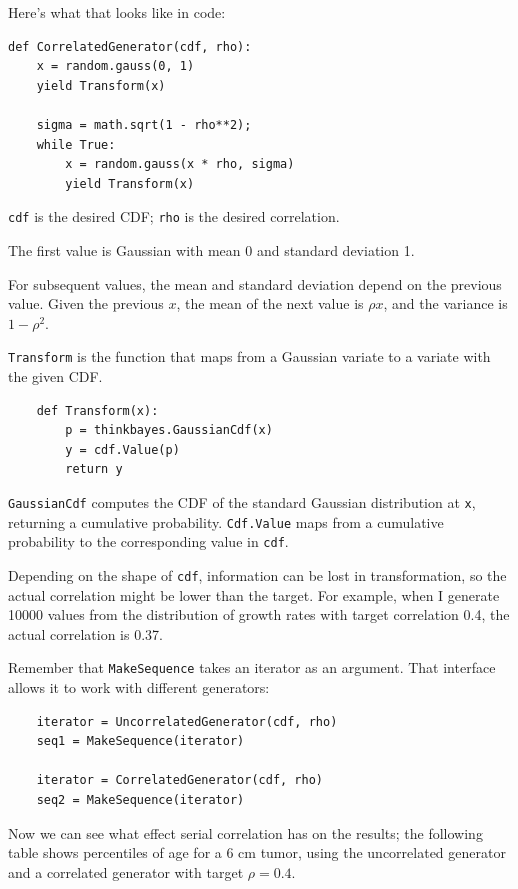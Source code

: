 \documentclass[12pt]{book}
\begin{document}
Here's what that looks like in code:

\begin{verbatim}
def CorrelatedGenerator(cdf, rho):
    x = random.gauss(0, 1)
    yield Transform(x)

    sigma = math.sqrt(1 - rho**2);    
    while True:
        x = random.gauss(x * rho, sigma)
        yield Transform(x)
\end{verbatim}

{\tt cdf} is the desired CDF; {\tt rho} is the desired correlation.

The first value is Gaussian with mean 0 and standard deviation 1.

For subsequent values, the mean and standard deviation depend on the
previous value.  Given the previous $x$, the mean of the next value is
$\rho x$, and the variance is $1 - \rho^2$.

{\tt Transform} is the function that maps from a Gaussian
variate to a variate with the given CDF.

\begin{verbatim}
    def Transform(x):
        p = thinkbayes.GaussianCdf(x)
        y = cdf.Value(p)
        return y
\end{verbatim}

{\tt GaussianCdf} computes the CDF of the standard Gaussian
distribution at {\tt x}, returning a cumulative probability.
{\tt Cdf.Value} maps from a cumulative probability to the
corresponding value in {\tt cdf}.

Depending on the shape of {\tt cdf}, information can
be lost in transformation, so the actual correlation might be
lower than the target.  For example, when I generate
10000 values from the distribution of growth rates with
target correlation 0.4, the actual correlation is 0.37.

Remember that {\tt MakeSequence} takes an iterator as an argument.
That interface allows it to work with different generators:

\begin{verbatim}
    iterator = UncorrelatedGenerator(cdf, rho)
    seq1 = MakeSequence(iterator)

    iterator = CorrelatedGenerator(cdf, rho)
    seq2 = MakeSequence(iterator)
\end{verbatim}

Now we can see what effect serial correlation has on the results;
the following table shows percentiles of age for a 6 cm tumor,
using the uncorrelated generator and a correlated generator
with target $\rho = 0.4$.
\end{document}
